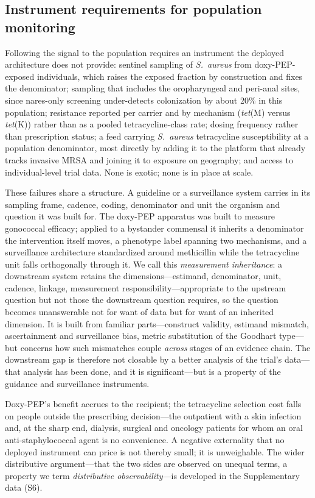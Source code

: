 \documentclass[12pt,a4paper]{article}
\newcommand{\sa}{\emph{S.~aureus}}
\begin{document}
\subsection*{Instrument requirements for population monitoring}
Following the signal to the population requires an instrument the deployed
architecture does not provide: sentinel sampling of \sa{} from doxy-PEP-exposed
individuals, which raises the exposed fraction by construction and fixes the
denominator; sampling that includes the oropharyngeal and peri-anal sites, since
nares-only screening under-detects colonization by about 20\% in this
population\cite{kyaw2012}; resistance reported per carrier and by mechanism
(\emph{tet}(M) versus \emph{tet}(K)) rather than as a pooled tetracycline-class
rate; dosing frequency rather than prescription status; a feed carrying \sa{} tetracycline
susceptibility at a population denominator, most directly by adding it to the
platform that already tracks invasive MRSA and joining it to exposure on
geography; and access to individual-level trial data. None is exotic; none
is in place at scale.

These failures share a structure. A guideline or a surveillance system carries in
its sampling frame, cadence, coding, denominator and unit the organism and
question it was built for. The doxy-PEP apparatus was built to measure gonococcal
efficacy; applied to a bystander commensal it inherits a denominator the
intervention itself moves, a phenotype label spanning two mechanisms, and a
surveillance architecture standardized around methicillin while the tetracycline
unit falls orthogonally through it. We call this \emph{measurement inheritance}: a
downstream system retains the dimensions---estimand, denominator, unit, cadence,
linkage, measurement responsibility---appropriate to the upstream question but not
those the downstream question requires, so the question becomes unanswerable not
for want of data but for want of an inherited dimension. It is built from
familiar parts---construct validity, estimand mismatch, ascertainment and
surveillance bias,\cite{tancredi2024surveillance} metric substitution of the
Goodhart type\cite{treem2023visibility}---but concerns how such mismatches couple
\emph{across} stages of an evidence chain. The downstream gap is therefore not
closable by a better analysis of the trial's data---that analysis has been done,
and it is significant---but is a property of the guidance and surveillance
instruments.

Doxy-PEP's benefit accrues to the recipient; the tetracycline selection cost
falls on people outside the prescribing decision---the outpatient with a skin
infection and, at the sharp end, dialysis, surgical and oncology patients for whom
an oral anti-staphylococcal agent is no convenience. A negative externality that
no deployed instrument can price is not thereby small; it is unweighable. The
wider distributive argument---that the two sides are observed on unequal terms, a
property we term \emph{distributive observability}---is developed in the
Supplementary data (S6).\cite{montoya2025affected}
\end{document}
